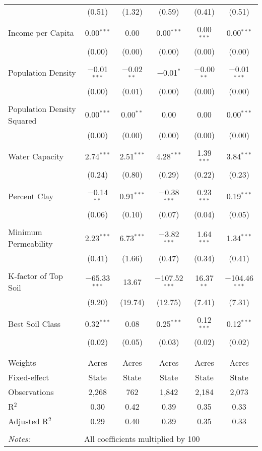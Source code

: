 \documentclass[10pt]{article}
\begin{document}
\begin{table}[!htbp]
\begin{tabular}{@{\extracolsep{5pt}}lccccc}
  & (0.51) & (1.32) & (0.59) & (0.41) & (0.51) \\ 
  & & & & & \\ 
 Income per Capita & 0.00$^{***}$ & 0.00 & 0.00$^{***}$ & 0.00$^{***}$ & 0.00$^{***}$ \\ 
  & (0.00) & (0.00) & (0.00) & (0.00) & (0.00) \\ 
  & & & & & \\ 
 Population Density & $-$0.01$^{***}$ & $-$0.02$^{**}$ & $-$0.01$^{*}$ & $-$0.00$^{**}$ & $-$0.01$^{***}$ \\ 
  & (0.00) & (0.01) & (0.00) & (0.00) & (0.00) \\ 
  & & & & & \\ 
 Population Density Squared & 0.00$^{***}$ & 0.00$^{**}$ & 0.00 & 0.00 & 0.00$^{***}$ \\ 
  & (0.00) & (0.00) & (0.00) & (0.00) & (0.00) \\ 
  & & & & & \\ 
 Water Capacity & 2.74$^{***}$ & 2.51$^{***}$ & 4.28$^{***}$ & 1.39$^{***}$ & 3.84$^{***}$ \\ 
  & (0.24) & (0.80) & (0.29) & (0.22) & (0.23) \\ 
  & & & & & \\ 
 Percent Clay & $-$0.14$^{**}$ & 0.91$^{***}$ & $-$0.38$^{***}$ & 0.23$^{***}$ & 0.19$^{***}$ \\ 
  & (0.06) & (0.10) & (0.07) & (0.04) & (0.05) \\ 
  & & & & & \\ 
 Minimum Permeability & 2.23$^{***}$ & 6.73$^{***}$ & $-$3.82$^{***}$ & 1.64$^{***}$ & 1.34$^{***}$ \\ 
  & (0.41) & (1.66) & (0.47) & (0.34) & (0.41) \\ 
  & & & & & \\ 
 K-factor of Top Soil & $-$65.33$^{***}$ & 13.67 & $-$107.52$^{***}$ & 16.37$^{**}$ & $-$104.46$^{***}$ \\ 
  & (9.20) & (19.74) & (12.75) & (7.41) & (7.31) \\ 
  & & & & & \\ 
 Best Soil Class & 0.32$^{***}$ & 0.08 & 0.25$^{***}$ & 0.12$^{***}$ & 0.12$^{***}$ \\ 
  & (0.02) & (0.05) & (0.03) & (0.02) & (0.02) \\ 
  & & & & & \\ 
\hline \\[-1.8ex] 
Weights & Acres & Acres & Acres & Acres & Acres \\ 
Fixed-effect & State & State & State & State & State \\ 
Observations & 2,268 & 762 & 1,842 & 2,184 & 2,073 \\ 
R$^{2}$ & 0.30 & 0.42 & 0.39 & 0.35 & 0.33 \\ 
Adjusted R$^{2}$ & 0.29 & 0.40 & 0.39 & 0.35 & 0.33 \\ 
\hline 
\hline \\[-1.8ex] 
\textit{Notes:} & \multicolumn{5}{l}{All coefficients multiplied by 100} \\ 
\end{tabular} 
\end{table} 
\end{document}
